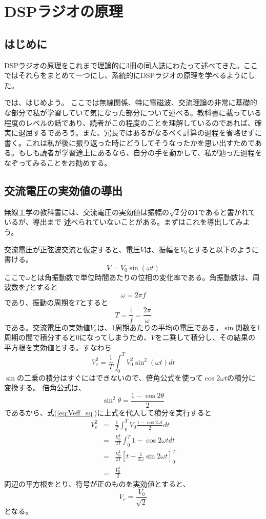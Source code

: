 \chapter*{DSPラジオの原理}
\section*{はじめに}
DSPラジオの原理をこれまで理論的に3冊の同人誌にわたって述べてきた。ここではそれらをまとめて一つにし、系統的にDSPラジオの原理を学べるようにした。

では、はじめよう。
ここでは無線関係、特に電磁波、交流理論の非常に基礎的な部分で私が学習していて気になった部分について述べる。教科書に載っている程度のレベルの話であり、読者がこの程度のことを理解しているのであれば、確実に退屈するであろう。また、冗長ではあるがなるべく計算の過程を省略せずに書く。これは私が後に振り返った時にどうしてそうなったかを思い出すためである。もしも読者が学習途上にあるなら、自分の手を動かして、私が辿った過程をなぞってみることをお勧めする。

\section*{交流電圧の実効値の導出}
無線工学の教科書には、交流電圧の実効値は振幅の$\sqrt{2}$分の1であると書かれているが、導出まで
述べられていないことがある。まずはこれを導出してみよう。

交流電圧が正弦波交流と仮定すると、電圧$V$は、振幅を$V_0$とすると以下のように書ける。
\begin{equation}
V=V_0 \sin(\omega t) \label{eq:defv}
\end{equation}
ここで$\omega$とは角振動数で単位時間あたりの位相の変化率である。角振動数は、周波数を$f$とすると
\[
\omega = 2 \pi f
\]
であり、振動の周期を$T$とすると
\[
T = \frac{1}{f} = \frac{2 \pi}{\omega}
\]
である。交流電圧の実効値$V_e$は、1周期あたりの平均の電圧である。$\sin$関数を1周期の間で積分すると$0$になってしまうため、$V$を二乗して積分し、その結果の平方根を実効値とする。すなわち
\begin{equation}
V_e^2 =\frac{1}{T} \int_{0}^{T}V_0^2\sin^2(\omega t)dt \label{eq:Veff_sq}
\end{equation}
$\sin$の二乗の積分はすぐにはできないので、倍角公式を使って$\cos 2\omega t$の積分に変換する。
倍角公式は、
\[
\sin^2\theta = \frac{1-\cos 2\theta}{2}
\]
であるから、式(\ref{eq:Veff_sq})に上式を代入して積分を実行すると
\begin{eqnarray*}
V_e^2 &=& \frac{1}{T}\int_{0}^{T} V_0 \frac{1-\cos 2\omega t}{2} dt \\
&=& \frac{V_0^2}{2T}\int_0^{T} 1 - \cos 2\omega t dt \\
&=& \frac{V_0^2}{2T}[t - \frac{1}{2 \omega}\sin 2\omega t ]_0^{T} \\
&=& \frac{V_0^2}{2}
\end{eqnarray*}
両辺の平方根をとり、符号が正のものを実効値とすると、
\[
V_e = \frac{V_0}{\sqrt{2}}
\]
となる。

